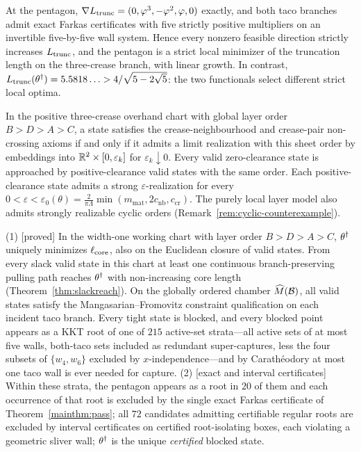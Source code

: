\begin{mainthm}\label{mainthm:kauffman}
At the pentagon, $\nabla L_{\mathrm{trunc}}=(0,\varphi^3,-\varphi^2,\varphi,0)$ exactly, and both taco branches admit exact Farkas certificates with five strictly positive multipliers on an invertible five-by-five wall system. Hence every nonzero feasible direction strictly increases $L_{\mathrm{trunc}}$, and the pentagon is a strict local minimizer of the truncation length on the three-crease branch, with linear growth. In contrast, $L_{\mathrm{trunc}}(\theta^\dagger)=5.5818\ldots>4/\sqrt{5-2\sqrt5}$: the two functionals select different strict local optima.
\end{mainthm}

\begin{mainthm}\label{mainthm:realization}
In the positive three-crease overhand chart with global layer order $B>D>A>C$, a state satisfies the crease-neighbourhood and crease-pair non-crossing axioms if and only if it admits a limit realization with this sheet order by embeddings into $\mathbb{R}^2\times[0,\varepsilon_k]$ for $\varepsilon_k\downarrow0$. Every valid zero-clearance state is approached by positive-clearance valid states with the same order. Each positive-clearance state admits a strong $\varepsilon$-realization for every $0<\varepsilon<\varepsilon_0(\theta)=\frac{2}{\pi\Lambda}\min(m_{\mathrm{mat}},2c_{\mathrm{nb}},c_{\mathrm{cr}})$. The purely local layer model also admits strongly realizable cyclic orders \textup{(Remark~\ref{rem:cyclic-counterexample})}.
\end{mainthm}

\begin{mainthm}\label{mainthm:census}
\textup{(1) [proved]} In the width-one working chart with layer order $B>D>A>C$, $\theta^\dagger$ uniquely minimizes $\ell_{\mathrm{core}}$, also on the Euclidean closure of valid states. From every slack valid state in this chart at least one continuous branch-preserving pulling path reaches $\theta^\dagger$ with non-increasing core length (Theorem~\ref{thm:slackreach}). On the globally ordered chamber $\widehat{M}(\mathcal{B})$, all valid states satisfy the Mangasarian--Fromovitz constraint qualification on each incident taco branch. Every tight state is blocked, and every blocked point appears as a KKT root of one of $215$ active-set strata---all active sets of at most five walls, both-taco sets included as redundant super-captures, less the four subsets of $\{w_4,w_6\}$ excluded by $x$-independence---and by Carath\'eodory at most one taco wall is ever needed for capture. \textup{(2) [exact and interval certificates]} Within these strata, the pentagon appears as a root in $20$ of them and each occurrence of that root is excluded by the single exact Farkas certificate of Theorem~\textup{\ref{mainthm:pass}}; all $72$ candidates admitting certifiable regular roots are excluded by interval certificates on certified root-isolating boxes, each violating a geometric sliver wall; $\theta^\dagger$ is the unique \emph{certified} blocked state.
\end{mainthm}


